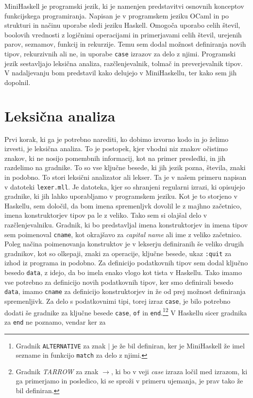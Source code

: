 \documentclass[12pt,a4paper,openany]{book}
\begin{document}
MiniHaskell je programski jezik, ki je namenjen predstavitvi osnovnih konceptov funkcijskega programiranja. Napisan je v programskem jeziku 
OCaml in po strukturi in načinu uporabe sledi jeziku Haskell. Omogoča uporabo celih števil, boolovih vrednosti z logičnimi operacijami in primerjavami 
celih števil, urejenih parov, seznamov, funkcij in rekurzije. Temu sem dodal možnost definiranja novih tipov, rekurzivnih ali ne, in 
uporabe \lstinline{case} izrazov za delo z njimi. Programski jezik sestavljajo leksična analiza, razčlenjevalnik, tolmač in preverjevalnik tipov. V nadaljevanju bom predstavil kako 
delujejo v MiniHaskellu, ter kako sem jih dopolnil.

\section{Leksična analiza}
Prvi korak, ki ga je potrebno narediti, ko dobimo izvorno kodo in jo želimo izvesti, je leksična analiza. To je postopek, kjer vhodni niz znakov očistimo znakov, ki ne nosijo pomembnih informacij, kot 
na primer presledki, in jih razdelimo na gradnike. To so vse ključne besede, ki jih jezik pozna, števila, znaki in podobno. To stori leksični analizator ali lekser. 
Ta je v našem primeru napisan v datoteki \lstinline{lexer.mll}. Je datoteka, kjer so shranjeni regularni izrazi, ki opisujejo gradnike, ki jih lahko uporabljamo v programskem jeziku. 
Kot je to storjeno v Haskellu, sem določil, da bom imena spremenljvk dovolil le z majhno začetnico, imena konstruktorjev tipov pa le z veliko. Tako sem si olajšal delo v razčlenjevalniku. 
Gradnik, ki bo predstavljal imena konstruktorjev in imena tipov sem poimenoval \lstinline{cname}, kot okrajšavo za \textit{capital name} ali ime z veliko začetnico. Poleg načina poimenovanja 
konstruktov je v lekserju definiranih še veliko drugih gradnikov, kot so olkepaji, znaki za operacije, ključne besede, ukaz \lstinline{:quit} za izhod iz programa 
in podobno. Za definicijo podatkovnih tipov sem dodal ključno besedo \lstinline{data}, z idejo, da bo imela enako vlogo kot tista v Haskellu. Tako imamo vse potrebno za 
definicijo novih podatkovnih tipov, ker smo definirali besedo \lstinline{data}, imamo \lstinline{cname} za definicijo konstruktorjev in že od prej možnost definiranja spremenljivk.
Za delo s podatkovnimi tipi, torej izraz \lstinline{case}, je bilo potrebno dodati še gradnike za ključne besede \lstinline{case}, \lstinline{of} in \lstinline{end}.\footnote{Gradnik \lstinline{ALTERNATIVE} 
za znak $\mid$ je že bil definiran, ker je MiniHaskell že imel sezname in funkcijo \lstinline{match} za delo z njimi.}\footnote{Gradnik \emph{TARROW} za znak \emph{$\rightarrow$}, ki bo v veji \emph{case} 
izraza ločil med izrazom, ki ga primerjamo in posledico, ki se sproži v primeru ujemanja, je prav tako že bil definiran.} V Haskellu sicer gradnika za \lstinline{end} ne poznamo, vendar ker za 
\end{document}
